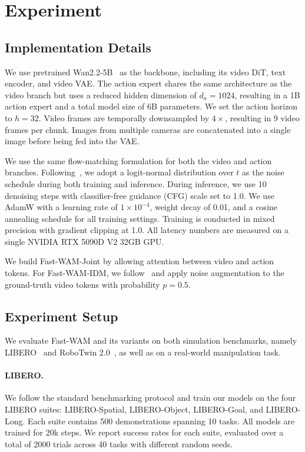 \section{Experiment}
\subsection{Implementation Details}
We use pretrained Wan2.2-5B~\cite{wan2025} as the backbone, including its video DiT, text encoder, and video VAE. The action expert shares the same architecture as the video branch but uses a reduced hidden dimension of $d_a=1024$, resulting in a 1B action expert and a total model size of 6B parameters. We set the action horizon to $h=32$. Video frames are temporally downsampled by $4\times$, resulting in 9 video frames per chunk. Images from multiple cameras are concatenated into a single image before being fed into the VAE.

We use the same flow-matching formulation for both the video and action branches. Following~\cite{wan2025}, we adopt a logit-normal distribution over $t$ as the noise schedule during both training and inference. During inference, we use 10 denoising steps with classifier-free guidance (CFG) scale set to 1.0. We use AdamW with a learning rate of $1\times10^{-4}$, weight decay of 0.01, and a cosine annealing schedule for all training settings. Training is conducted in mixed precision with gradient clipping at 1.0. All latency numbers are measured on a single NVIDIA RTX 5090D V2 32GB GPU.

We build Fast-WAM-Joint by allowing attention between video and action tokens. For Fast-WAM-IDM, we follow~\cite{lingbot-va2026} and apply noise augmentation to the ground-truth video tokens with probability $p=0.5$.



\subsection{Experiment Setup}
We evaluate Fast-WAM and its variants on both simulation benchmarks, namely LIBERO~\cite{liu2023libero} and RoboTwin 2.0~\cite{chen2025robotwin}, as well as on a real-world manipulation task.

\paragraph{LIBERO.}
We follow the standard benchmarking protocol and train our models on the four LIBERO suites: LIBERO-Spatial, LIBERO-Object, LIBERO-Goal, and LIBERO-Long. Each suite contains 500 demonstrations spanning 10 tasks. All models are trained for 20k steps. We report success rates for each suite, evaluated over a total of 2000 trials across 40 tasks with different random seeds.

